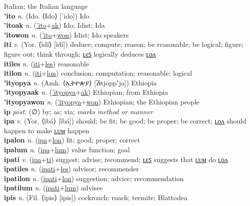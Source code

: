 Italian; the Italian language \label{'italyatilip} \\
\textbf{'ito} \textit{n.} (Ido. ⟨Ido⟩ [ˈido])
Ido \label{'ito} \\
\textbf{'itoak} \textit{n.} (\hyperref['ito]{'ito}+\hyperref[ak]{ak})
Ido; Idist; Ida \label{'itoak} \\
\textbf{'itowon} \textit{n.} (\hyperref['ito]{'ito}+\hyperref[won]{won})
Idist; Ido speakers \label{'itowon} \\
\textbf{iti} \textit{v.} (Yor. ⟨ìdí⟩ [ìdí])
deduce; compute; reason; be reasonable; be logical; figure; figure out; think through; \hyperref[itiles]{ʟєꜱ} logically deduces \hyperref[itilon]{ʟᴏᴧ} \label{iti} \\
\textbf{itiles} \textit{n.} (\hyperref[iti]{iti}+\hyperref[les]{les})
reasonable \label{itiles} \\
\textbf{itilon} \textit{n.} (\hyperref[iti]{iti}+\hyperref[lon]{lon})
conclusion; computation; reasonable; logical \label{itilon} \\
\textbf{'ityopya} \textit{n.} (Amh. ⟨ኢትዮጵያ⟩ [ʔɨtjoppʼja])
Ethiopia \label{'ityopya} \\
\textbf{'ityopyaak} \textit{n.} (\hyperref['ityopya]{'ityopya}+\hyperref[ak]{ak})
Ethiopian; from Ethiopia \label{'ityopyaak} \\
\textbf{'ityopyawon} \textit{n.} (\hyperref['ityopya]{'ityopya}+\hyperref[won]{won})
Ethiopian; the Ethiopian people \label{'ityopyawon} \\
\textbf{ip} \textit{post.} (∅)
by; as; via; \textit{marks method or manner} \label{ip} \\
\textbf{ipa} \textit{v.} (Yor. ⟨ìbá⟩ [ìbá])
should; be fit; be good; be proper; be correct; \hyperref[ipalon]{ʟᴏᴧ} should happen to make \hyperref[ipalum]{ʟᴜᴍ} happen \label{ipa} \\
\textbf{ipalon} \textit{n.} (\hyperref[ipa]{ipa}+\hyperref[lon]{lon})
fit; good; proper; correct \label{ipalon} \\
\textbf{ipalum} \textit{n.} (\hyperref[ipa]{ipa}+\hyperref[lum]{lum})
value function; goal \label{ipalum} \\
\textbf{ipati} \textit{v.} (\hyperref[ipa]{ipa}+\hyperref[ti]{ti})
suggest; advise; recommend; \hyperref[ipatiles]{ʟєꜱ} suggests that \hyperref[ipatilum]{ʟᴜᴍ} do \hyperref[ipatilon]{ʟᴏᴧ} \label{ipati} \\
\textbf{ipatiles} \textit{n.} (\hyperref[ipati]{ipati}+\hyperref[les]{les})
advisor; recommender \label{ipatiles} \\
\textbf{ipatilon} \textit{n.} (\hyperref[ipati]{ipati}+\hyperref[lon]{lon})
suggestion; advice; recommendation \label{ipatilon} \\
\textbf{ipatilum} \textit{n.} (\hyperref[ipati]{ipati}+\hyperref[lum]{lum})
advisee \label{ipatilum} \\
\textbf{ipis} \textit{n.} (Fil. ⟨ipis⟩ [ipis])
cockroach; roach; termite; Blattodea \label{ipis} \\
